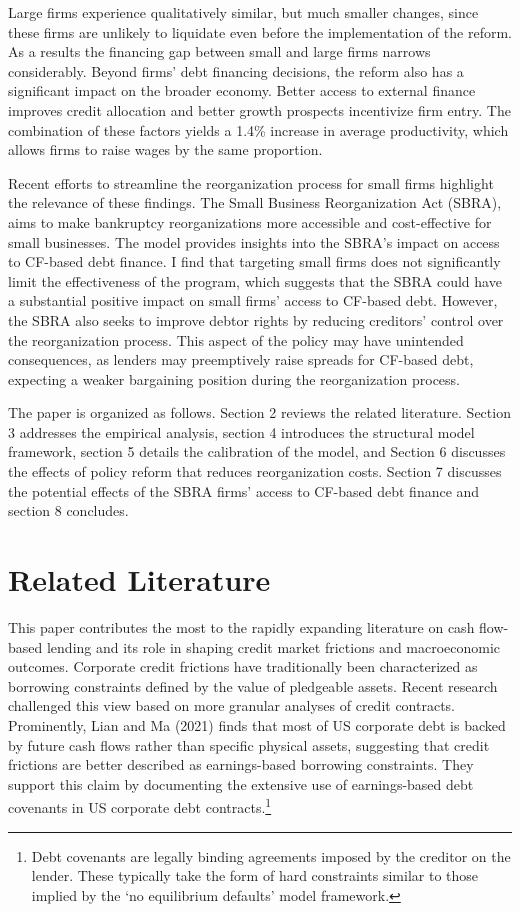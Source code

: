 \documentclass[12pt]{article}
\begin{document}
Large firms experience qualitatively similar, but much smaller changes, since these firms are unlikely to liquidate even before the implementation of the reform. As a results the financing gap between small and large firms narrows considerably. Beyond firms' debt financing decisions, the reform also has a significant impact on the broader economy. Better access to external finance improves credit allocation and better growth prospects incentivize firm entry. The combination of these factors yields a 1.4\% increase in average productivity, which allows firms to raise wages by the same proportion.

Recent efforts to streamline the reorganization process for small firms highlight the relevance of these findings. The Small Business Reorganization Act (SBRA), aims to make bankruptcy reorganizations more accessible and cost-effective for small businesses. The model provides insights into the SBRA’s impact on access to CF-based debt finance. I find that targeting small firms does not significantly limit the effectiveness of the program, which suggests that the SBRA could have a substantial positive impact on small firms' access to CF-based debt. However, the SBRA also seeks to improve debtor rights by reducing creditors' control over the reorganization process. This aspect of the policy may have unintended consequences, as lenders may preemptively raise spreads for CF-based debt, expecting a weaker bargaining position during the reorganization process.

The paper is organized as follows. Section 2 reviews the related literature. Section 3 addresses the empirical analysis, section 4 introduces the structural model framework, section 5 details the calibration of the model, and Section 6 discusses the effects of policy reform that reduces reorganization costs. Section 7 discusses the potential effects of the SBRA firms' access to CF-based debt finance and section 8 concludes.

\section{Related Literature \label{sec:literature}} 
This paper contributes the most to the rapidly expanding literature on cash flow-based lending and its role in shaping credit market frictions and macroeconomic outcomes. Corporate credit frictions have traditionally been characterized as borrowing constraints defined by the value of pledgeable assets. Recent research challenged this view based on more granular analyses of credit contracts. Prominently, Lian and Ma (2021) finds that most of US corporate debt is backed by future cash flows rather than specific physical assets, suggesting that credit frictions are better described as earnings-based borrowing constraints. They support this claim by documenting the extensive use of earnings-based debt covenants in US corporate debt contracts.\footnote{Debt covenants are legally binding agreements imposed by the creditor on the lender. These typically take the form of hard constraints similar to those implied by the `no equilibrium defaults' model framework.} 
\end{document}
